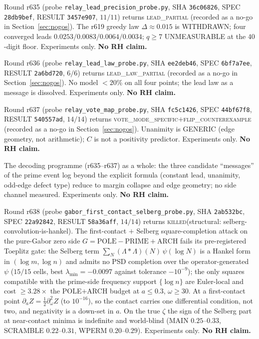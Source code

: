 \documentclass[11pt]{article}
\theoremstyle{definition}
\theoremstyle{remark}
\begin{document}
\noindent Round r635 (probe \texttt{relay\_lead\_precision\_probe.py},
SHA \texttt{36c06826}, SPEC \texttt{28db9bef}, RESULT
\texttt{3457e907}, $11/11$) returns \textsc{lead\_partial}
(recorded as a no-go in Section~\ref{sec:nogos}).  The r619
greedy law $\Delta\approx 0.015$ is WITHDRAWN; four
converged leads $0.0253/0.0083/0.0064/0.0034$; $q\ge 7$
UNMEASURABLE at the $40$-digit floor.  Experiments only.
\textbf{No RH claim.}

\noindent Round r636 (probe \texttt{relay\_lead\_law\_probe.py},
SHA \texttt{ee2deb46}, SPEC \texttt{6bf7a7ee}, RESULT
\texttt{2a6bd720}, $6/6$) returns \textsc{lead\_law\_partial}
(recorded as a no-go in Section~\ref{sec:nogos}).  No model
$<20\%$ on all four points; the lead law as a message is
dissolved.  Experiments only.  \textbf{No RH claim.}

\noindent Round r637 (probe \texttt{relay\_vote\_map\_probe.py},
SHA \texttt{fc5c1426}, SPEC \texttt{44bf67f8}, RESULT
\texttt{540557ad}, $14/14$) returns
\textsc{vote\_mode\_specific}$+$\textsc{flip\_counterexample}
(recorded as a no-go in Section~\ref{sec:nogos}).
Unanimity is GENERIC (edge geometry, not arithmetic); $C$
is not a positivity predictor.  Experiments only.
\textbf{No RH claim.}

\noindent The decoding programme (r635--r637) as a whole:
the three candidate ``messages'' of the prime event log
beyond the explicit formula (constant lead, unanimity,
odd-edge defect type) reduce to margin collapse and edge
geometry; no side channel measured.
Experiments only.  \textbf{No RH claim.}

\noindent Round r638 (probe \texttt{gabor\_first\_contact\_selberg\_probe.py},
SHA \texttt{2ab532bc}, SPEC \texttt{22a92842}, RESULT
\texttt{58a36aff}, $14/14$) returns
\textsc{killed}(structural: selberg-convolution-is-hankel).
The first-contact $+$ Selberg square-completion attack on the
pure-Gabor zero side $G=\mathrm{POLE}-\mathrm{PRIME}+\mathrm{ARCH}$
fails its pre-registered Toeplitz gate: the Selberg term
$\sum_N(\Lambda*\Lambda)(N)\,\psi(\log N)$ is a Hankel form in
$(\log m,\log n)$ and admits no PSD completion over the
operator-generated $\psi$ ($15/15$ cells, best
$\lambda_{\min}=-0.0097$ against tolerance $-10^{-9}$); the only
squares compatible with the prime-side frequency support
$\{\log n\}$ are Euler-local and cost $\ge 3.28\times$ the
POLE$+$ARCH budget at $a\le 0.3$, $\omega\ge 30$.  At a
first-contact point $\partial_aZ=\tfrac12\partial_\omega^2Z$ (to
$10^{-16}$), so the contact carries one differential condition,
not two, and negativity is a down-set in $a$.  On the true
$\zeta$ the sign of the Selberg part at near-contact minima is
indefinite and world-blind (MAIN $0.25$--$0.33$, SCRAMBLE
$0.22$--$0.31$, WPERM $0.20$--$0.29$).  Experiments only.
\textbf{No RH claim.}
\end{document}
